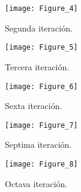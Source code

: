 \documentclass{article}
\begin{document}
\begin{figure}
\begin{center}
\texttt{[image: Figure\_4]}
\end{center}
\caption{Segunda iteraci\'on.}
\end{figure}

\begin{figure}
\begin{center}
\texttt{[image: Figure\_5]}
\end{center}
\caption{Tercera iteraci\'on.}
\end{figure}


\begin{figure}
\begin{center}
\texttt{[image: Figure\_6]}
\end{center}
\caption{Sexta iteraci\'on.}
\end{figure}


\begin{figure}
\begin{center}
\texttt{[image: Figure\_7]}
\end{center}
\caption{Septima iteraci\'on.}
\end{figure}


\begin{figure}
\begin{center}
\texttt{[image: Figure\_8]}
\end{center}
\caption{Octava iteraci\'on.}
\end{figure}
\end{document}

